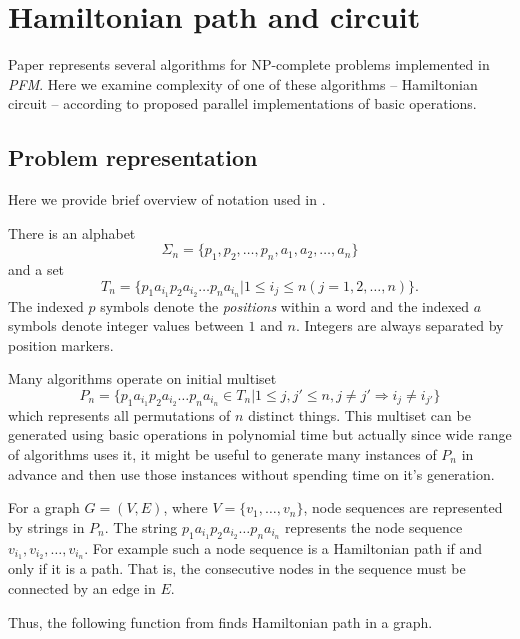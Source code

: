 \section{Hamiltonian path and circuit} \label{algo}

Paper \cite{Katsanyi:2003} represents several algorithms for NP-complete problems implemented in \emph{PFM}. Here we examine complexity of one of these algorithms -- Hamiltonian circuit -- according to proposed parallel implementations of basic operations.

\subsection{Problem representation}
Here we provide brief overview of notation used in \cite{Katsanyi:2003}. 

There is an alphabet
$$\Sigma_n = \{p_1, p_2, \dots, p_n, a_1, a_2, \dots, a_n\}$$
and a set
$$T_n = \{p_1 a_{i_1} p_2 a_{i_2} \dots p_n a_{i_n} |
1 \leq i_j \leq n (j = 1, 2, \dots, n)\}.$$
The indexed $p$ symbols denote the \emph{positions} within a word and the indexed $a$ symbols denote integer values between $1$ and $n$. Integers are always separated by position markers.

Many algorithms operate on initial multiset 
$$P_n=\{p_1 a_{i_1} p_2 a_{i_2} \dots p_n a_{i_n} \in T_n | 
         1 \leq j, j' \leq n, j \neq j' \Rightarrow i_j \neq i_{j'}\}$$ 
which represents all permutations of $n$ distinct things. This multiset can be generated using basic operations in polynomial time \cite{Amos:1996} but actually since wide range of algorithms uses it, it might be useful to generate many instances of $P_n$ in advance and then use those instances without spending time on it's generation.

For a graph $G=(V, E)$, where $V=\{v_1, \dots, v_n\}$, node sequences are represented by strings in $P_n$. The string $p_1 a_{i_1} p_2 a_{i_2} \dots p_n a_{i_n}$ represents the node sequence $v_{i_1}, v_{i_2}, \dots, v_{i_n}$. For example such a node sequence is a Hamiltonian path if and only if it is a path. That is, the consecutive nodes in the sequence must be connected by an edge in $E$.

Thus, the following function from \cite{Amos:1996} finds Hamiltonian path in a graph.


